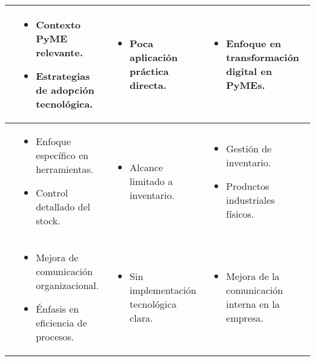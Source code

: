 \begin{longtable}{|p{}|p{}|p{}|p{}|}
	\cite{Rodeiro2012}                                                &
	\begin{itemize}
		\item Contexto PyME relevante.
		\item Estrategias de adopción tecnológica.
	\end{itemize}                        &
	\begin{itemize}
		\item Poca aplicación práctica directa.
	\end{itemize}                           &
	\begin{itemize}
		\item Enfoque en transformación digital en PyMEs.
	\end{itemize}                                                                                                    \\
	\hline

	\cite{Flores2015}                                                 &
	\begin{itemize}
		\item Enfoque específico en herramientas.
		\item Control detallado del stock.
	\end{itemize}                         &
	\begin{itemize}
		\item Alcance limitado a inventario.
	\end{itemize}                              &
	\begin{itemize}
		\item Gestión de inventario.
		\item Productos industriales físicos.
	\end{itemize}                                                                                                                \\
	\hline

	\cite{Reyes2012}                                                  &
	\begin{itemize}
		\item Mejora de comunicación organizacional.
		\item Énfasis en eficiencia de procesos.
	\end{itemize}                      &
	\begin{itemize}
		\item Sin implementación tecnológica clara.
	\end{itemize}                       &
	\begin{itemize}
		\item Mejora de la comunicación interna en la empresa.
	\end{itemize}                                                                                               \\
	\hline


\end{longtable}
